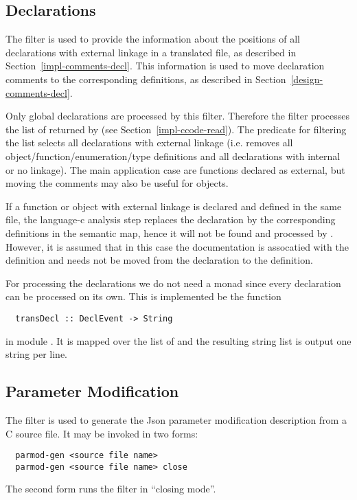 \subsection{Declarations}
\label{impl-ccomps-decls}

The filter  is used to provide the information about the positions of all declarations with
external linkage in
a translated file, as described in Section~\ref{impl-comments-decl}. This information is used to move declaration
comments to the corresponding definitions, as described in Section~\ref{design-comments-decl}.

Only global declarations are processed by this filter. Therefore the filter processes the list of 
returned by  (see Section~\ref{impl-ccode-read}). The predicate for filtering the list
selects all declarations with external linkage (i.e. removes all object/function/enumeration/type definitions and 
all declarations with internal or no linkage). 
The main application case are functions declared as external, but moving the comments may also be useful for 
objects.

If a function or object with external linkage is declared and defined in the same file, the language-c analysis step
replaces the declaration by the corresponding definitions in the semantic map, hence it will not be found and processed
by . However, it is assumed that in this case the documentation is assocatied with the definition
and needs not be moved from the declaration to the definition.

For processing the declarations we do not need a monad since every declaration can be processed on its own. This is implemented
be the function
\begin{verbatim}
  transDecl :: DeclEvent -> String
\end{verbatim}
in module . It is mapped over the list of  and the resulting string list
is output one string per line.

\subsection{Parameter Modification}
\label{impl-ccomps-parmod}

The filter  is used to generate the Json parameter modification description from a C source file.
It may be invoked in two forms:
\begin{verbatim}
  parmod-gen <source file name>
  parmod-gen <source file name> close
\end{verbatim}
The second form runs the filter in ``closing mode''.

